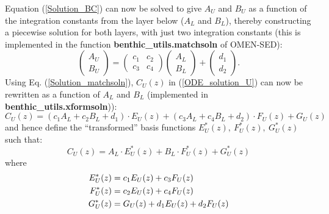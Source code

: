 \documentclass[gmd, manuscript]{copernicus}
\begin{document}
Equation (\ref{Solution_BC}) can now be solved to give $A_U$ and $B_U$ as a function of the integration constants from the layer below ($A_L$ and $B_L$), thereby constructing a piecewise solution for both layers, 
with just two integration constants (this is implemented in the function \textsf{\textbf{benthic\_utils.matchsoln}} of OMEN-SED): %
\begin{equation}
\begin{pmatrix} A_U \\ B_U \end{pmatrix} = \begin{pmatrix} c_1 & c_2 \\ c_3 & c_4 \end{pmatrix} \begin{pmatrix} A_L \\ B_L \end{pmatrix} + \begin{pmatrix} d_1 \\ d_2 \end{pmatrix} . \label{Solution_matchsoln} 
\end{equation}
Using Eq. (\ref{Solution_matchsoln}), $C_U(z)$ in (\ref{ODE_solution_U}) can now be rewritten as a function of $A_L$ and $B_L$ (implemented in  \textsf{\textbf{benthic\_utils.xformsoln}})):
\begin{equation}
 C_U(z) = (c_1 A_L + c_2 B_L + d_1) \cdot E_U(z) + (c_3 A_L + c_4 B_L + d_2) \cdot F_U(z) + G_U(z)  \label{Eq:Sol_Upper_rewritten}
\end{equation}
and hence define the ``transformed'' basis functions $E_U^*(z),\ F_U^*(z),\ G_U^*(z)$ such that:
\begin{equation}
 C_U(z) = A_L \cdot E_U^*(z) + B_L \cdot F_U^*(z) + G_U^*(z) \label{Solution_Upper_transformed_basis_fct}
\end{equation}
where
\begin{align}
 E_U^*(z) &= c_1 E_U(z) + c_3 F_U(z) \notag\\
 F_U^*(z) &= c_2 E_U(z) + c_4 F_U(z) \label{Solution_NEW_EFG}\\
 G_U^*(z) &= G_U(z) + d_1 E_U(z) + d_2 F_U(z) \notag
\end{align}
\end{document}
